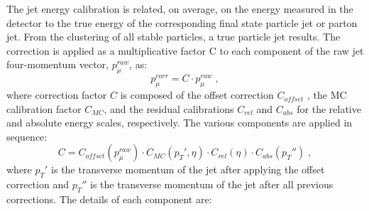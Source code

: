 The jet energy calibration is related,  on average, on the energy measured in
the detector to the true energy of the corresponding final state particle jet or parton jet.
From the clustering  of all stable particles, a true particle jet results. The correction is applied as
a multiplicative factor C to each component of the raw jet four-momentum vector, $p_{\mu}^{raw}$, as:
\newline
\begin{equation}
p_{\mu}^{corr}=C \cdot p_{\mu}^{raw} \; ,
\end{equation}
where correction factor $C$ is composed of the offset correction $C_{offset}$ , the MC calibration
factor $C_{MC}$, and the residual calibrations $C_{rel}$ and $C_{abs}$ for the relative and absolute
energy scales, respectively. The various components are applied in sequence:
\newline
\begin{equation}
C=   C_{offset} ( p_{\mu}^{raw}) \cdot  C_{MC} (p_T',\eta) \cdot C_{rel}(\eta) \cdot  C_{abs} (p_T'') \; ,
\end{equation}
\newline
where $p_T'$ is the transverse momentum of the jet after applying the offset correction and $p_T''$ is the transverse momentum 
of the jet after all previous corrections. The details of each component are:
